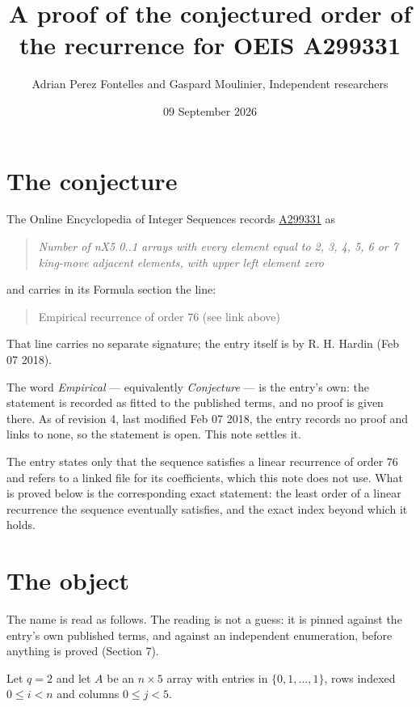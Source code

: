 \documentclass[11pt]{article}
\title{A proof of the conjectured order of the recurrence for OEIS A299331}
\author{Adrian Perez Fontelles and Gaspard Moulinier, Independent researchers}
\date{09 September 2026}
\theoremstyle{definition}
\begin{document}
\maketitle
\section{The conjecture}

The Online Encyclopedia of Integer Sequences records \href{https://oeis.org/A299331}{A299331} as

\begin{quote}\itshape Number of nX5 0..1 arrays with every element equal to 2, 3, 4, 5, 6 or 7 king-move adjacent elements, with upper left element zero\end{quote}

and carries in its Formula section the line:

\begin{quote}\ttfamily Empirical recurrence of order 76 (see link above)\end{quote}

That line carries no separate signature; the entry itself is by R. H. Hardin (Feb 07 2018).

The word {\itshape Empirical} --- equivalently {\itshape Conjecture} --- is the entry's own: the statement is recorded as fitted to the published terms, and no proof is given there. As of revision 4, last modified Feb 07 2018, the entry records no proof and links to none, so the statement is open. This note settles it.

The entry states only that the sequence satisfies a linear recurrence of order $76$ and refers to a linked file for its coefficients, which this note does not use. What is proved below is the corresponding exact statement: the least order of a linear recurrence the sequence eventually satisfies, and the exact index beyond which it holds.

\section{The object}

The name is read as follows. The reading is not a guess: it is pinned against the entry's own published terms, and against an independent enumeration, before anything is proved (Section 7).

Let $q = 2$ and let $A$ be an $n \times 5$ array with entries in $\{0,1,\dots,1\}$, rows indexed $0 \le i < n$ and columns $0 \le j < 5$.
\end{document}
